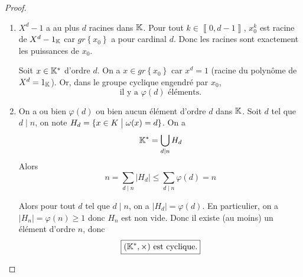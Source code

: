 \begin{proof}
	\phantom{}
	\begin{enumerate}
		\item $X^{d}-1$ a au plus $d$ racines dans $\mathbb{K}$. Pour tout $k\in\left\llbracket 0,d-1\right\rrbracket$, $x_{0}^{k}$ est racine de $X^{d}-1_{\mathbb{K}}$ car $gr\left\{x_{0}\right\}$ a pour cardinal $d$. Donc les racines sont exactement les puissances de $x_{0}$.
		
		Soit $x\in\mathbb{K}^{*}$ d'ordre $d$. On a $x\in gr\left\{x_{0}\right\}$ car $x^{d}=1$ (racine du polynôme de $X^{d}=1_{\mathbb{K}}$). Or, dans le groupe cyclique engendré par $x_{0}$, 
		\begin{equation}
			\boxed{\text{il y a }\varphi(d)\text{ éléments.}}
		\end{equation}

		\item On a ou bien $\varphi(d)$ ou bien aucun élément d'ordre $d$ dans $\mathbb{K}$. Soit $d$ tel que $d\mid n$, on note $H_{d}=\{x\in K\bigm| \omega(x)=d\}$. On a 
		\begin{equation}
			\mathbb{K}^{*}=\bigcup_{d\mid n}H_{d}
		\end{equation}
		Alors
		\begin{equation}
			n=\sum_{d\mid n}\vert H_{d}\vert\leqslant\sum_{d\mid n}\varphi(d)=n
		\end{equation}

		Alors pour tout $d$ tel que $d\mid n$, on a $\vert H_{d}\vert=\varphi(d)$. En particulier, on a $\vert H_{n}\vert=\varphi(n)\geqslant1$ donc $H_{n}$ est non vide. Donc il existe (au moins) un élément d'ordre $n$, donc 
		\begin{equation}
			\boxed{(\mathbb{K}^{*},\times)\text{ est cyclique.}}
		\end{equation}
	\end{enumerate}
\end{proof}

